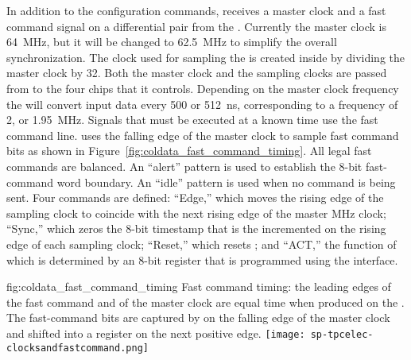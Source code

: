 In addition to the configuration commands,  %
receives a master clock and a fast command signal on a  
differential pair from
the . Currently the master clock is \SI{64}{MHz}, but it will be
changed to \SI{62.5}{MHz} to simplify the overall   
synchronization. The clock used for sampling the  is created inside
 by dividing the master clock by \num{32}. Both the master clock and
the  sampling clocks are passed from  to the four
 chips that it controls. Depending on the master clock frequency
the  will convert input data every \num{500} or \SI{512}{ns}, 
corresponding to a frequency of \num{2}, or \SI{1.95}{MHz}. Signals that must be executed at a known time use the fast command 
line.  
uses the falling edge of the master clock to sample fast command bits as shown 
in Figure~\ref{fig:coldata_fast_command_timing}. All legal fast commands 
are  balanced. An ``alert'' pattern is used to establish the 8-bit 
fast-command word boundary. An ``idle'' pattern is used when no command is being 
sent. Four commands are defined: ``Edge,'' which moves the rising edge of the 
 sampling clock to coincide with the next rising edge of the 
master MHz clock; ``Sync,'' which zeros the \num{8}-bit timestamp that is the incremented 
on the rising edge of each  sampling clock; ``Reset,'' which resets 
; and ``ACT,'' the function of which is determined by an \num{8}-bit 
register that is programmed using the  interface.  

\begin{dunefigure}
{fig:coldata_fast_command_timing}
{Fast command timing: the leading edges of the fast command and of the master 
clock are equal time when produced on the . The fast-command bits 
are captured by  on the falling edge of the master clock and 
shifted into a register on the next positive edge.}
\texttt{[image: sp-tpcelec-clocksandfastcommand.png]}
\end{dunefigure}


